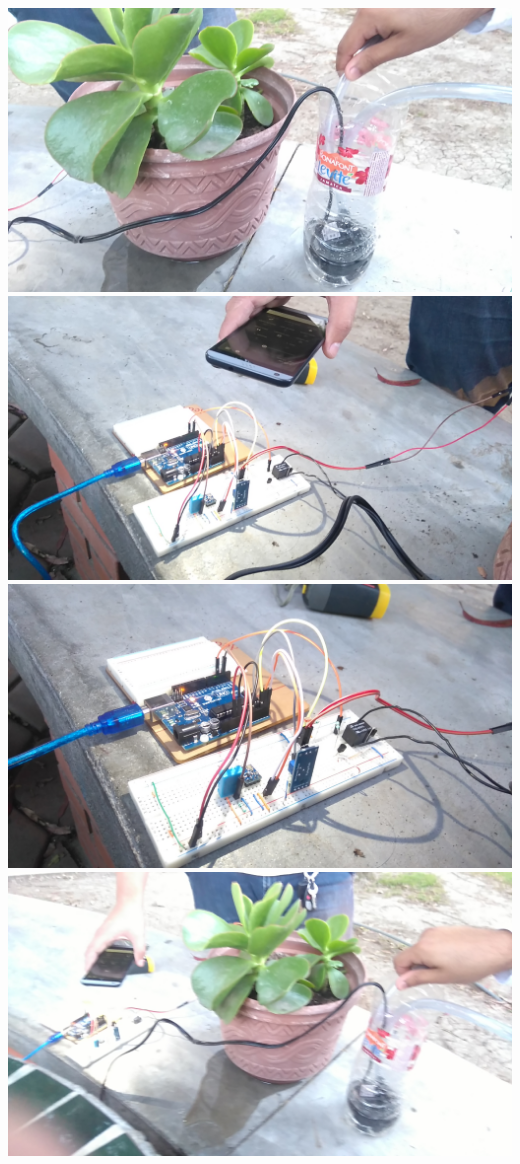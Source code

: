 \documentclass{article}
\begin{document}
\includegraphics[width=\textwidth]{captura/2}
\includegraphics[width=\textwidth]{captura/3}
\includegraphics[width=\textwidth]{captura/4}
\includegraphics[width=\textwidth]{captura/5}
\end{document}
